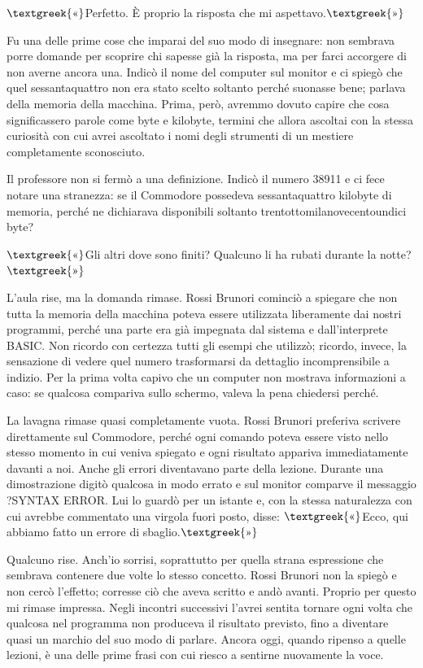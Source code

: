 \documentclass{article}
\begin{document}
$\text{\textgreek{«}}$Perfetto. È proprio la risposta che mi aspettavo.$\text{\textgreek{»}}$

Fu una delle prime cose che imparai del suo modo di insegnare: non sembrava porre domande per scoprire chi sapesse già
la risposta, ma per farci accorgere di non averne ancora una. Indicò il nome del computer sul monitor e ci spiegò che
quel sessantaquattro non era stato scelto soltanto perché suonasse bene; parlava della memoria della macchina. Prima,
però, avremmo dovuto capire che cosa significassero parole come byte e kilobyte, termini che allora ascoltai con la
stessa curiosità con cui avrei ascoltato i nomi degli strumenti di un mestiere completamente sconosciuto.

Il professore non si fermò a una definizione. Indicò il numero 38911 e ci fece notare una stranezza: se il Commodore
possedeva sessantaquattro kilobyte di memoria, perché ne dichiarava disponibili soltanto trentottomilanovecentoundici
byte?

$\text{\textgreek{«}}$Gli altri dove sono finiti? Qualcuno li ha rubati durante la notte?$\text{\textgreek{»}}$

L'aula rise, ma la domanda rimase. Rossi Brunori cominciò a spiegare che non tutta la memoria della macchina poteva
essere utilizzata liberamente dai nostri programmi, perché una parte era già impegnata dal sistema e dall'interprete
BASIC. Non ricordo con certezza tutti gli esempi che utilizzò; ricordo, invece, la sensazione di vedere quel numero
trasformarsi da dettaglio incomprensibile a indizio. Per la prima volta capivo che un computer non mostrava
informazioni a caso: se qualcosa compariva sullo schermo, valeva la pena chiedersi perché.

La lavagna rimase quasi completamente vuota. Rossi Brunori preferiva scrivere direttamente sul Commodore, perché ogni
comando poteva essere visto nello stesso momento in cui veniva spiegato e ogni risultato appariva immediatamente
davanti a noi. Anche gli errori diventavano parte della lezione. Durante una dimostrazione digitò qualcosa in modo
errato e sul monitor comparve il messaggio ?SYNTAX ERROR. Lui lo guardò per un istante e, con la stessa naturalezza con
cui avrebbe commentato una virgola fuori posto, disse: $\text{\textgreek{«}}$Ecco, qui abbiamo fatto un errore di
sbaglio.$\text{\textgreek{»}}$

Qualcuno rise. Anch'io sorrisi, soprattutto per quella strana espressione che sembrava contenere due volte lo stesso
concetto. Rossi Brunori non la spiegò e non cercò l'effetto; corresse ciò che aveva scritto e andò avanti. Proprio per
questo mi rimase impressa. Negli incontri successivi l'avrei sentita tornare ogni volta che qualcosa nel programma non
produceva il risultato previsto, fino a diventare quasi un marchio del suo modo di parlare. Ancora oggi, quando ripenso
a quelle lezioni, è una delle prime frasi con cui riesco a sentirne nuovamente la voce.
\end{document}
